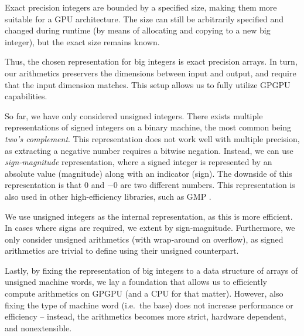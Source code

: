 Exact precision integers are bounded by a specified size, making them more
suitable for a GPU architecture. The size can still be arbitrarily specified and
changed during runtime (by means of allocating and copying to a new big
integer), but the exact size remains known.

Thus, the chosen representation for big integers is exact precision arrays. In
turn, our arithmetics preservers the dimensions between input and output, and
require that the input dimension matches. This setup allows us to fully utilize
GPGPU capabilities.  \newline

So far, we have only considered unsigned integers. There exists multiple
representations of signed integers on a binary machine, the most common being
\textit{two's complement}. This representation does not work well with multiple
precision, as extracting a negative number requires a bitwise negation. Instead,
we can use \textit{sign-magnitude} representation, where a signed integer is
represented by an absolute value (magnitude) along with an indicator (sign). The
downside of this representation is that $0$ and $-0$ are two different
numbers. This representation is also used in other high-efficiency libraries,
such as GMP \cite{GMP}.

We use unsigned integers as the internal representation, as this is more
efficient. In cases where signs are required, we extent by
sign-magnitude. Furthermore, we only consider unsigned arithmetics (with
wrap-around on overflow), as signed arithmetics are trivial to define using
their unsigned counterpart.  \newline

Lastly, by fixing the representation of big integers to a data structure of
arrays of unsigned machine words, we lay a foundation that allows us to
efficiently compute arithmetics on GPGPU (and a CPU for that matter). However,
also fixing the type of machine word (i.e.\ the base) does not increase
performance or efficiency -- instead, the arithmetics becomes more strict,
hardware dependent, and nonextensible.


